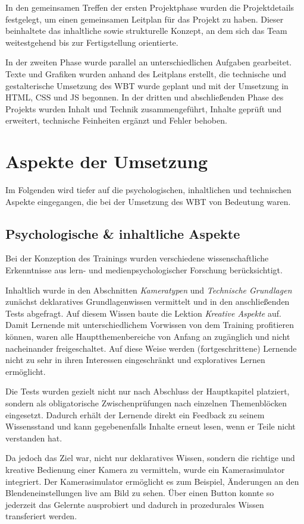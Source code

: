 \documentclass{article}
\begin{document}
In den gemeinsamen Treffen der ersten Projektphase wurden die Projektdetails festgelegt, um einen gemeinsamen Leitplan f\"ur das Projekt zu haben. Dieser beinhaltete das inhaltliche sowie strukturelle Konzept, an dem sich das Team weitestgehend bis zur Fertigstellung orientierte.

In der zweiten Phase wurde parallel an unterschiedlichen Aufgaben gearbeitet. Texte und Grafiken wurden anhand des Leitplans erstellt, die technische und gestalterische Umsetzung des WBT wurde geplant und mit der Umsetzung in HTML, CSS und JS begonnen.
In der dritten und abschließenden Phase des Projekts wurden Inhalt und Technik zusammengef\"uhrt, Inhalte gepr\"uft und erweitert, technische Feinheiten erg\"anzt und Fehler behoben.

\section{Aspekte der Umsetzung}
\label{sec:umsetzung}
Im Folgenden wird tiefer auf die psychologischen, inhaltlichen und technischen Aspekte eingegangen, die bei der Umsetzung des WBT von Bedeutung waren. 


\subsection{Psychologische \& inhaltliche Aspekte}
\label{ssec:psy}
Bei der Konzeption des Trainings wurden verschiedene wissenschaftliche Erkenntnisse aus lern- und medienpsychologischer Forschung ber\"ucksichtigt.

Inhaltlich wurde in den Abschnitten \emph{Kameratypen} und \emph{Technische Grundlagen} zun\"achst deklaratives Grundlagenwissen vermittelt und in den anschließenden Tests abgefragt. Auf diesem Wissen baute die Lektion \emph{Kreative Aspekte} auf. Damit Lernende mit unterschiedlichem Vorwissen von dem Training profitieren k\"onnen, waren alle Hauptthemenbereiche von Anfang an zug\"anglich und nicht nacheinander freigeschaltet. Auf diese Weise werden (fortgeschrittene) Lernende nicht zu sehr in ihren Interessen eingeschr\"ankt und exploratives Lernen erm\"oglicht.

Die Tests wurden gezielt nicht nur nach Abschluss der Hauptkapitel platziert, sondern als obligatorische Zwischenpr\"ufungen nach einzelnen Themenbl\"ocken eingesetzt. Dadurch erh\"alt der Lernende direkt ein Feedback zu seinem Wissensstand und kann gegebenenfalls Inhalte erneut lesen, wenn er Teile nicht verstanden hat.

Da jedoch das Ziel war, nicht nur deklaratives Wissen, sondern die richtige und kreative Bedienung einer Kamera zu vermitteln, wurde ein Kamerasimulator integriert. Der Kamerasimulator erm\"oglicht es zum Beispiel, \"Anderungen an den Blendeneinstellungen live am Bild zu sehen. \"Uber einen Button konnte so jederzeit das Gelernte ausprobiert und dadurch in prozedurales Wissen transferiert werden. 
\end{document}
